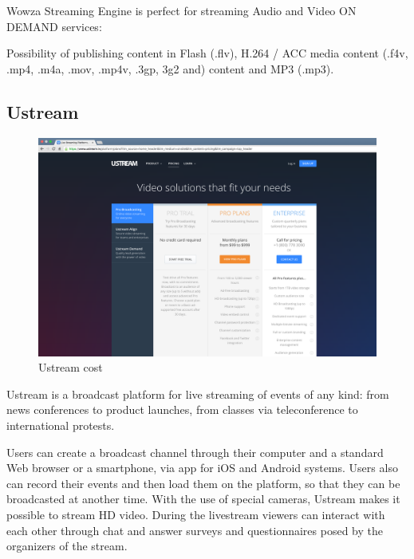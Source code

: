 Wowza Streaming Engine is perfect for streaming Audio and Video ON DEMAND services:

Possibility of publishing content in Flash (.flv), H.264 / ACC media content (.f4v, .mp4, .m4a, .mov, .mp4v, .3gp, 3g2 and) content and MP3 (.mp3).


\subsection{Ustream}
\label{sec:Ustream}

\begin{figure}[!htb]
 \centering
 \includegraphics[width=1.0\linewidth]{images/chapter2/ustream.png}\hfill
 \caption[Ustream cost]{Ustream cost}
 \label{fig:fourV}
\end{figure}

Ustream is a broadcast platform for live streaming of events of any kind: from news conferences to product launches, from classes via teleconference to international protests.

Users can create a broadcast channel through their computer and a standard Web browser or a smartphone, via app for iOS and Android systems.
Users also can record their events and then load them on the platform, so that they can be broadcasted at another time. With the use of special cameras, Ustream makes it possible to stream HD video.
During the livestream viewers can interact with each other through chat and answer surveys and questionnaires posed by the organizers of the stream.

  